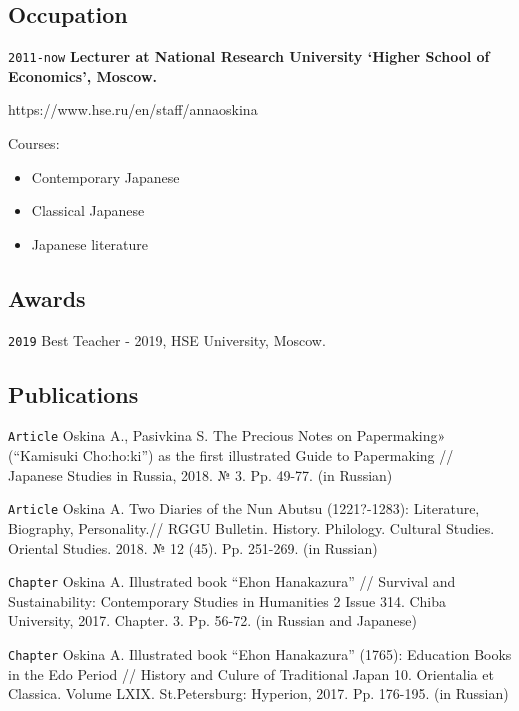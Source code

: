 \documentclass[]{article}
\providecommand{\tightlist}{%
  \setlength{\itemsep}{0pt}\setlength{\parskip}{0pt}}
\begin{document}
\hypertarget{occupation}{%
\subsection{Occupation}\label{occupation}}

\texttt{2011-now} \textbf{Lecturer at National Research University
`Higher School of Economics', Moscow.}

https://www.hse.ru/en/staff/annaoskina

Courses:

\begin{itemize}
\tightlist
\item
  Contemporary Japanese
\item
  Classical Japanese
\item
  Japanese literature
\end{itemize}

\hypertarget{awards}{%
\subsection{Awards}\label{awards}}

\texttt{2019} Best Teacher - 2019, HSE University, Moscow.

\hypertarget{publications}{%
\subsection{Publications}\label{publications}}

\texttt{Article} Oskina A., Pasivkina S. The Precious Notes on
Papermaking» (``Kamisuki Cho:ho:ki'') as the first illustrated Guide to
Papermaking // Japanese Studies in Russia, 2018. № 3. Pp. 49-77. (in
Russian)

\texttt{Article} Oskina A. Two Diaries of the Nun Abutsu (1221?-1283):
Literature, Biography, Personality.// RGGU Bulletin. History. Philology.
Cultural Studies. Oriental Studies. 2018. № 12 (45). Pp. 251-269. (in
Russian)

\texttt{Chapter} Oskina A. Illustrated book ``Ehon Hanakazura'' //
Survival and Sustainability: Contemporary Studies in Humanities 2 Issue
314. Chiba University, 2017. Chapter. 3. Pp. 56-72. (in Russian and
Japanese)

\texttt{Chapter} Oskina A. Illustrated book ``Ehon Hanakazura'' (1765):
Education Books in the Edo Period // History and Culure of Traditional
Japan 10. Orientalia et Classica. Volume LXIX. St.Petersburg: Hyperion,
2017. Pp. 176-195. (in Russian)
\end{document}
